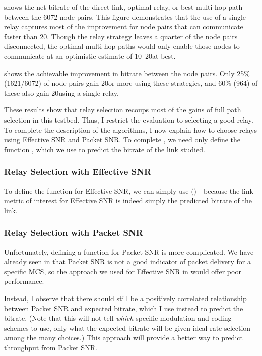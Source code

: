  shows the net bitrate of the direct link, optimal relay, or best multi-hop path between the 6072 node pairs. This figure demonstrates that the use of a single relay captures most of the improvement for node pairs that can communicate faster than 20\Mbps. Though the relay strategy leaves a quarter of the node pairs disconnected, the optimal multi-hop paths would only enable those nodes to communicate at an optimistic estimate of 10--20\Mbps at best.

 shows the achievable improvement in bitrate between the node pairs. Only 25\% (1621/6072) of node pairs gain 20\Mbps or more using these strategies, and 60\% (964) of these also gain 20\Mbps using a single relay.

These results show that relay selection recoups most of the gains of full path selection in this testbed. Thus, I restrict the evaluation to selecting a good relay. To complete the description of the algorithms, I now explain how to choose relays using Effective SNR and Packet SNR. To complete , we need only define the function , which we use to predict the bitrate of the link studied.

\subsubsection{Relay Selection with Effective SNR}
To define the function  for Effective SNR, we can simply use  ()---because the link metric of interest for Effective SNR is indeed simply the predicted bitrate of the link.

\subsubsection{Relay Selection with Packet SNR}
Unfortunately, defining a  function for Packet SNR is more complicated. We have already seen in  that Packet SNR is not a good indicator of packet delivery for a specific MCS, so the approach we used for Effective SNR in  would offer poor performance.

Instead, I observe that there should still be a positively correlated relationship between Packet SNR and expected bitrate, which I use instead to predict the bitrate. (Note that this will not tell \emph{which} specific modulation and coding schemes to use, only what the expected bitrate will be given ideal rate selection among the many choices.) This approach will provide a better way to predict throughput from Packet SNR.

